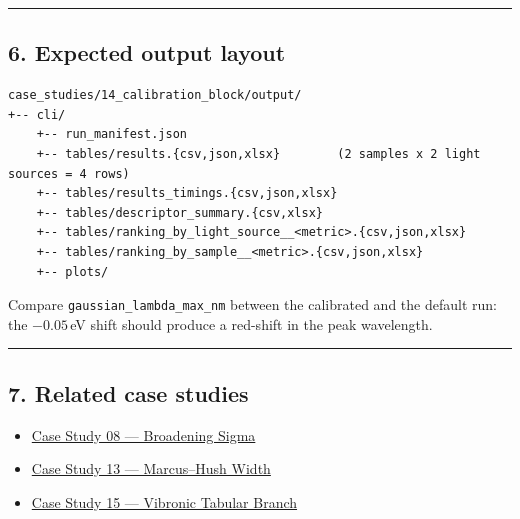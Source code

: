 \documentclass[
  11pt,
]{article}
\providecommand{\tightlist}{
  \setlength{\itemsep}{0pt}\setlength{\parskip}{0pt}}
\begin{document}
\begin{center}\rule{0.5\linewidth}{0.5pt}\end{center}

\hypertarget{6-expected-output-layout}{
\subsection{6. Expected output layout}\label{6-expected-output-layout}}

\begin{verbatim}
case_studies/14_calibration_block/output/
+-- cli/
    +-- run_manifest.json
    +-- tables/results.{csv,json,xlsx}        (2 samples x 2 light sources = 4 rows)
    +-- tables/results_timings.{csv,json,xlsx}
    +-- tables/descriptor_summary.{csv,xlsx}
    +-- tables/ranking_by_light_source__<metric>.{csv,json,xlsx}
    +-- tables/ranking_by_sample__<metric>.{csv,json,xlsx}
    +-- plots/
\end{verbatim}

Compare \texttt{gaussian\_lambda\_max\_nm} between the calibrated and
the default run: the \(-0.05\)\,eV shift should produce a red-shift in
the peak wavelength.

\begin{center}\rule{0.5\linewidth}{0.5pt}\end{center}

\hypertarget{7-related-case-studies}{
\subsection{7. Related case studies}\label{7-related-case-studies}}

\begin{itemize}
\tightlist
\item
  \href{https://github.com/pinarsyt/overlap-calculator/blob/main/case_studies/08_broadening_sigma/README.md}{Case
  Study 08 --- Broadening Sigma}
\item
  \href{https://github.com/pinarsyt/overlap-calculator/blob/main/case_studies/13_marcus_hush_width/README.md}{Case
  Study 13 --- Marcus--Hush Width}
\item
  \href{https://github.com/pinarsyt/overlap-calculator/blob/main/case_studies/15_vibronic_tabular_branch/README.md}{Case
  Study 15 --- Vibronic Tabular Branch}
\end{itemize}
\end{document}

